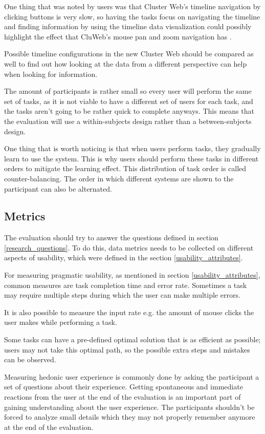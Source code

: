 One thing that was noted by users was that Cluster Web's timeline navigation by clicking buttons is very slow, so having the tasks focus on navigating the timeline and finding information by using the timeline data visualization could possibly highlight the effect that CluWeb's mouse pan and zoom navigation has .

Possible timeline configurations in the new Cluster Web should be compared as well to find out how looking at the data from a different perspective can help when looking for information.

The amount of participants is rather small so every user will perform the same set of tasks, as it is not viable to have a different set of users for each task, and the tasks aren't going to be rather quick to complete anyways. This means that the evaluation will use a within-subjects design rather than a between-subjects design. 

One thing that is worth noticing is that when users perform tasks, they gradually learn to use the system. This is why users should perform these tasks in different orders to mitigate the learning effect. This distribution of task order is called counter-balancing. The order in which different systems are shown to the participant can also be alternated.
\cite{rubin2008handbook}

\subsection{Metrics}
The evaluation should try to answer the questions defined in section \ref{research_questions}. To do this, data metrics needs to be collected on different aspects of usability, which were defined in the section \ref{usability_attributes}.

For measuring pragmatic usability, as mentioned in section \ref{usability_attributes}, common measures are task completion time and error rate. Sometimes a task may require multiple steps during which the user can make multiple errors. 

It is also possible to measure the input rate e.g. the amount of mouse clicks the user makes while performing a task.

Some tasks can have a pre-defined optimal solution that is as efficient as possible; users may not take this optimal path, so the possible extra steps and mistakes can be observed. \cite{hornbaek2006current}

Measuring hedonic user experience is commonly done by asking the participant a set of questions about their experience. Getting spontaneous and immediate reactions from the user at the end of the evaluation is an important part of gaining understanding about the user experience. The participants shouldn't be forced to analyze small details which they may not properly remember anymore at the end of the evaluation. \cite{laugwitz2008construction}


